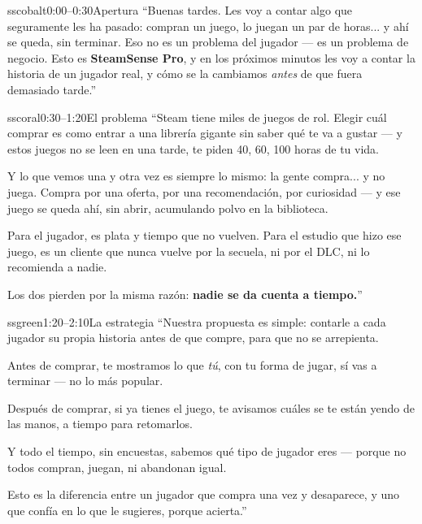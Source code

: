 \documentclass[12pt,letterpaper]{article}
\begin{document}
\vspace{0.2cm}

\begin{cuebox}{sscobalt}{0:00--0:30}{Apertura}
``Buenas tardes. Les voy a contar algo que seguramente les ha pasado: compran un juego, lo juegan un par de horas... y ahí se queda, sin terminar. Eso no es un problema del jugador --- es un problema de negocio. Esto es \textbf{SteamSense Pro}, y en los próximos minutos les voy a contar la historia de un jugador real, y cómo se la cambiamos \textit{antes} de que fuera demasiado tarde.''
\end{cuebox}

\begin{cuebox}{sscoral}{0:30--1:20}{El problema}
``Steam tiene miles de juegos de rol. Elegir cuál comprar es como entrar a una librería gigante sin saber qué te va a gustar --- y estos juegos no se leen en una tarde, te piden 40, 60, 100 horas de tu vida.

Y lo que vemos una y otra vez es siempre lo mismo: la gente compra... y no juega. Compra por una oferta, por una recomendación, por curiosidad --- y ese juego se queda ahí, sin abrir, acumulando polvo en la biblioteca.

Para el jugador, es plata y tiempo que no vuelven. Para el estudio que hizo ese juego, es un cliente que nunca vuelve por la secuela, ni por el DLC, ni lo recomienda a nadie.

Los dos pierden por la misma razón: \textbf{nadie se da cuenta a tiempo.}''
\end{cuebox}

\begin{cuebox}{ssgreen}{1:20--2:10}{La estrategia}
``Nuestra propuesta es simple: contarle a cada jugador su propia historia antes de que compre, para que no se arrepienta.

Antes de comprar, te mostramos lo que \textit{tú}, con tu forma de jugar, sí vas a terminar --- no lo más popular.

Después de comprar, si ya tienes el juego, te avisamos cuáles se te están yendo de las manos, a tiempo para retomarlos.

Y todo el tiempo, sin encuestas, sabemos qué tipo de jugador eres --- porque no todos compran, juegan, ni abandonan igual.

Esto es la diferencia entre un jugador que compra una vez y desaparece, y uno que confía en lo que le sugieres, porque acierta.''
\end{cuebox}
\end{document}
